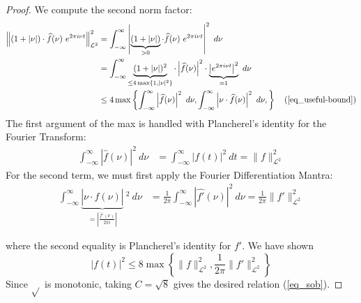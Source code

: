 \documentclass[12pt, reqno]{article}
\theoremstyle{definition}
\theoremstyle{remark}
\begin{document}
\begin{proof}
We compute the second norm factor:
\begin{align*}
\left\|(1+|\nu|)\cdot\widehat f(\nu)~e^{2\pi i \nu t}\right\|_{\mathcal{L}^{2}}^{2}&= \int_{-\infty}^{\infty}\left|\underbrace{(1+|\nu|)}_{>0}\cdot \widehat f(\nu)~e^{2\pi i \nu t}\right|^{2}\ d \nu\\
&= \int_{-\infty}^{\infty}\underbrace{(1+|\nu|)^{2}}_{\le4\max\{1,|\nu|^{2}\}}\cdot \left|\widehat f(\nu)\right|^{2}\cdot\underbrace{\left|e^{2\pi i \nu t}\right|^{2}}_{=1}\ d \nu\\
&\le 4\max\left\{\int_{-\infty}^{\infty}\left|\widehat f(\nu)\right|^{2}\ d \nu,\int_{-\infty}^{\infty}\left| \nu\cdot\widehat f(\nu)\right|^{2}\ d \nu,\right\}\quad(\ref{eq_useful-bound})
\end{align*}
The first argument of the max is handled with Plancherel's identity for the Fourier Transform: 
\begin{align*}
\int_{-\infty}^{\infty}\left|\widehat f(\nu)\right|^{2}\ d \nu&= \int_{-\infty}^{\infty}\left|f(t)\right|^{2} \ dt=\|f\|_{\mathcal{L}^{2}}^{2}
\end{align*}
For the second term, we must first apply the Fourier Differentiation Mantra: 
\begin{align*}
\int_{-\infty}^{\infty}\underbrace{\left|\nu \cdot\widehat f(\nu)\right|}_{=\left| \frac{\widehat f'(\nu)}{2\pi i}\right|}\ ^{2}\ d \nu&= \frac{1}{2\pi}\int_{-\infty}^{\infty}\left|\widehat{f'}(\nu)\right|^{2}\ d \nu= \frac{1}{2\pi}\|f'\|_{\mathcal{L}^{2}}^{2}
\end{align*}

where the second equality is Plancherel's identity for $f'$. We have shown$$
|f(t)|^{2}\le 8\max\left\{\|f\|^{2}_{\mathcal{L}^{2}}, \frac{1}{2\pi}\|f'\|_{\mathcal{L}^{2}}^{2}\right\}
$$Since $\sqrt{}$ is monotonic, taking $C=\sqrt{8}$ gives the desired relation (\ref{eq_sob}).  

\end{proof}


\end{document}
